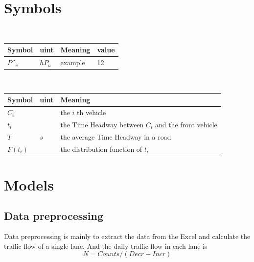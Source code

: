 \documentclass{mcmthesis}
\begin{document}
\section{Symbols}
\begin{table}[H]
        \setlength{\abovecaptionskip}{0pt}
        \setlength{\belowcaptionskip}{0pt}
				\\
        \begin{tabular}{p{2cm}|p{2cm}|p{7.5cm}|p{1.7cm}}
		\hline
		\rowcolor[gray]{0.9}\bf{Symbol}	&\bf{uint}      &\bf{Meaning}&\bf{value}	\\
		\hline
		${P}''_{v}$		& $hP_{a}$		 & example  &12\\

		\hline
	\end{tabular}
\end{table}

\begin{table}[H]
        \setlength{\abovecaptionskip}{0pt}
        \setlength{\belowcaptionskip}{0pt}
         \\
        \begin{tabular}{p{1.8cm}|p{2.2cm}|p{9cm}}
        \hline
        \rowcolor[gray]{0.9}\bf{Symbol}	&\bf{uint}      &\bf{Meaning}\\
        \hline
        $C_{i}$	&$ $ &the $i$ th vehicle\\
        $t_{i}$	&$ $ &the Time Headway between $ C_{i} $ and the front vehicle\\
        $T$	&$s$ &the average Time Headway in a road\\
        $F(t_{i})$	&$ $ &the distribution function of $t_{i}$
\\
        
        \end{tabular}
        \end{table}

\section{Models}
\subsection{Data preprocessing}
Data preprocessing is mainly to extract the data from the Excel and calculate the traffic flow of a single lane. And the daily traffic flow in each lane is\\
\begin{equation}
N=Counts/(Decr+Incr)
\end{equation}
\end{document}
